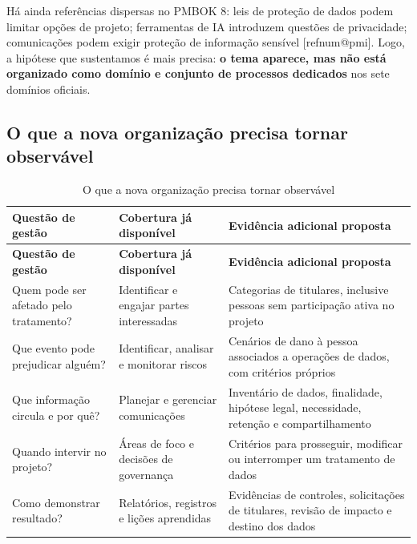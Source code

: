 \documentclass[11pt,a4paper]{article}
\makeatletter
\newcommand{\refnum}[1]{\csname refnum@#1\endcsname}
\newcommand{\SingleSpacing}{}
\newcommand{\fontetab}[1]{\par\vspace{3pt}{\small\noindent Fonte: #1\par}}
\makeatother
\begin{document}
Há ainda referências dispersas no PMBOK 8: leis de proteção de dados podem limitar opções de projeto; ferramentas de IA introduzem questões de privacidade; comunicações podem exigir proteção de informação sensível [\refnum{pmi}]. Logo, a hipótese que sustentamos é mais precisa: \textbf{o tema aparece, mas não está organizado como domínio e conjunto de processos dedicados} nos sete domínios oficiais.
\subsection{O que a nova organização precisa tornar observável}

\begingroup\SingleSpacing\small
\begin{longtable}{@{}>{\raggedright\arraybackslash}p{}>{\raggedright\arraybackslash}p{}>{\raggedright\arraybackslash}p{}@{}}
\caption{O que a nova organização precisa tornar observável}\label{tab:t1}\\
\toprule
\textbf{Questão de gestão} & \textbf{Cobertura já disponível} & \textbf{Evidência adicional proposta}\\
\midrule
\endfirsthead
\toprule
\textbf{Questão de gestão} & \textbf{Cobertura já disponível} & \textbf{Evidência adicional proposta}\\
\midrule
\endhead
\bottomrule
\endfoot
\bottomrule
\endlastfoot
Quem pode ser afetado pelo tratamento? & Identificar e engajar partes interessadas & Categorias de titulares, inclusive pessoas sem participação ativa no projeto\\[3pt]
Que evento pode prejudicar alguém? & Identificar, analisar e monitorar riscos & Cenários de dano à pessoa associados a operações de dados, com critérios próprios\\[3pt]
Que informação circula e por quê? & Planejar e gerenciar comunicações & Inventário de dados, finalidade, hipótese legal, necessidade, retenção e compartilhamento\\[3pt]
Quando intervir no projeto? & Áreas de foco e decisões de governança & Critérios para prosseguir, modificar ou interromper um tratamento de dados\\[3pt]
Como demonstrar resultado? & Relatórios, registros e lições aprendidas & Evidências de controles, solicitações de titulares, revisão de impacto e destino dos dados\\[3pt]
\end{longtable}
\endgroup
\fontetab{Elaborado pelos autores (2026).}
\end{document}
